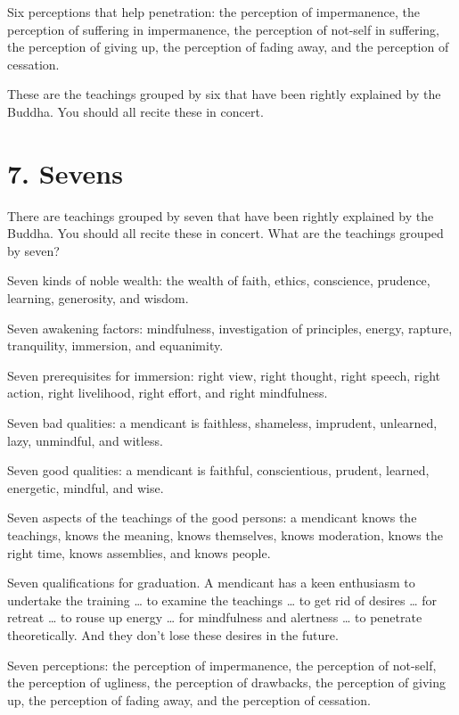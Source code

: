 \documentclass[12pt,openany]{book}%
\begin{document}
Six perceptions that help penetration: the perception of impermanence, the perception of suffering in impermanence, the perception of not-self in suffering, the perception of giving up, the perception of fading away, and the perception of cessation. 

These are the teachings grouped by six that have been rightly explained by the Buddha. You should all recite these in concert. 

\section*{7. Sevens }

There are teachings grouped by seven that have been rightly explained by the Buddha. You should all recite these in concert. What are the teachings grouped by seven? 

Seven kinds of noble wealth: the wealth of faith, ethics, conscience, prudence, learning, generosity, and wisdom. 

Seven awakening factors: mindfulness, investigation of principles, energy, rapture, tranquility, immersion, and equanimity. 

Seven prerequisites for immersion: right view, right thought, right speech, right action, right livelihood, right effort, and right mindfulness. 

Seven bad qualities: a mendicant is faithless, shameless, imprudent, unlearned, lazy, unmindful, and witless. 

Seven good qualities: a mendicant is faithful, conscientious, prudent, learned, energetic, mindful, and wise. 

Seven aspects of the teachings of the good persons: a mendicant knows the teachings, knows the meaning, knows themselves, knows moderation, knows the right time, knows assemblies, and knows people. 

Seven qualifications for graduation. A mendicant has a keen enthusiasm to undertake the training … to examine the teachings … to get rid of desires … for retreat … to rouse up energy … for mindfulness and alertness … to penetrate theoretically. And they don’t lose these desires in the future. 

Seven perceptions: the perception of impermanence, the perception of not-self, the perception of ugliness, the perception of drawbacks, the perception of giving up, the perception of fading away, and the perception of cessation. 
\end{document}
